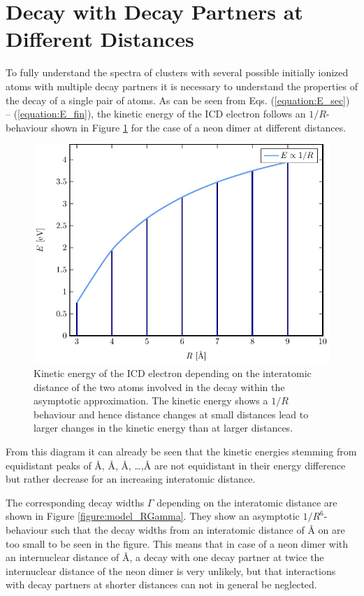 \section{Decay with Decay Partners at Different Distances}
\label{sec:partners}

To fully understand the spectra of clusters with several possible
initially ionized atoms with multiple decay partners it is necessary to
understand the properties of the decay of a single pair of atoms. As can be seen
from Eqs. (\ref{equation:E_sec}) -- (\ref{equation:E_fin}),
the kinetic energy of the ICD electron follows an
$1/R$-behaviour shown in Figure \ref{figure:model_RE} for the case
of a neon dimer at different distances.

\begin{figure}[h]
 \centering
 \includegraphics[width=\columnwidth]{pics/model_RE.pdf}
 \caption{Kinetic energy of the ICD electron depending on the interatomic
          distance of the two atoms involved in the decay within the
          asymptotic approximation. The kinetic energy shows a $1/R$
          behaviour and hence distance changes at small distances lead
          to larger changes in the kinetic energy than at larger distances.}
 \label{figure:model_RE}
\end{figure}
From this diagram it can already be
seen that the kinetic energies stemming from equidistant peaks of
\unit[3]{\AA}, \unit[4]{\AA}, \unit[5]{\AA}, \dots ,\unit[9]{\AA} are
not equidistant in their energy difference but rather decrease for
an increasing interatomic distance.

The corresponding decay widths $\Gamma$ depending on the interatomic
distance are shown in Figure \ref{figure:model_RGamma}. They show an
asymptotic $1/R^6$-behaviour such that the decay widths from an interatomic
distance of \unit[7]{\AA} on are too small to be seen in the
figure. This means that in case of a neon dimer with an internuclear distance
of \unit[3]{\AA}, a decay with one decay partner at twice the internuclear
distance of the neon dimer is very unlikely, but that interactions with
decay partners at shorter distances can not in general be neglected.

